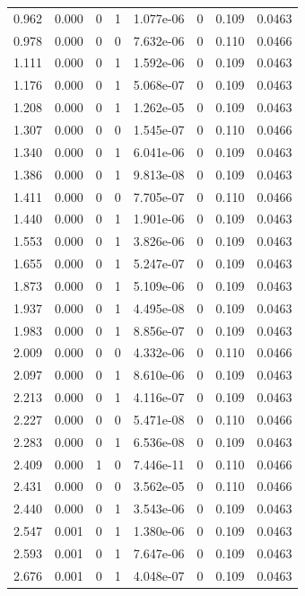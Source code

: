 \documentclass[preview]{standalone}
\begin{document}
{{\begin{tabular}{L{1.2cm}C{1.2cm} C{0.3cm}C{0.5cm} C{1.4cm}C{1.4cm} C{1.4cm}C{1.4cm}}
  0.962  &  0.000  & 0     &  1 &  1.077e-06  & 0  & 0.109 &  0.0463   \\ 
  0.978  &  0.000  & 0     &  0 &  7.632e-06  & 0  & 0.110 &  0.0466   \\ 
  1.111  &  0.000  & 0     &  1 &  1.592e-06  & 0  & 0.109 &  0.0463   \\ 
  1.176  &  0.000  & 0     &  1 &  5.068e-07  & 0  & 0.109 &  0.0463   \\ 
  1.208  &  0.000  & 0     &  1 &  1.262e-05  & 0  & 0.109 &  0.0463   \\ 
  1.307  &  0.000  & 0     &  0 &  1.545e-07  & 0  & 0.110 &  0.0466   \\ 
  1.340  &  0.000  & 0     &  1 &  6.041e-06  & 0  & 0.109 &  0.0463   \\ 
  1.386  &  0.000  & 0     &  1 &  9.813e-08  & 0  & 0.109 &  0.0463   \\ 
  1.411  &  0.000  & 0     &  0 &  7.705e-07  & 0  & 0.110 &  0.0466   \\ 
  1.440  &  0.000  & 0     &  1 &  1.901e-06  & 0  & 0.109 &  0.0463   \\ 
  1.553  &  0.000  & 0     &  1 &  3.826e-06  & 0  & 0.109 &  0.0463   \\ 
  1.655  &  0.000  & 0     &  1 &  5.247e-07  & 0  & 0.109 &  0.0463   \\ 
  1.873  &  0.000  & 0     &  1 &  5.109e-06  & 0  & 0.109 &  0.0463   \\ 
  1.937  &  0.000  & 0     &  1 &  4.495e-08  & 0  & 0.109 &  0.0463   \\ 
  1.983  &  0.000  & 0     &  1 &  8.856e-07  & 0  & 0.109 &  0.0463   \\ 
  2.009  &  0.000  & 0     &  0 &  4.332e-06  & 0  & 0.110 &  0.0466   \\ 
  2.097  &  0.000  & 0     &  1 &  8.610e-06  & 0  & 0.109 &  0.0463   \\ 
  2.213  &  0.000  & 0     &  1 &  4.116e-07  & 0  & 0.109 &  0.0463   \\ 
  2.227  &  0.000  & 0     &  0 &  5.471e-08  & 0  & 0.110 &  0.0466   \\ 
  2.283  &  0.000  & 0     &  1 &  6.536e-08  & 0  & 0.109 &  0.0463   \\ 
  2.409  &  0.000  & 1     &  0 &  7.446e-11  & 0  & 0.110 &  0.0466   \\ 
  2.431  &  0.000  & 0     &  0 &  3.562e-05  & 0  & 0.110 &  0.0466   \\ 
  2.440  &  0.000  & 0     &  1 &  3.543e-06  & 0  & 0.109 &  0.0463   \\ 
  2.547  &  0.001  & 0     &  1 &  1.380e-06  & 0  & 0.109 &  0.0463   \\ 
  2.593  &  0.001  & 0     &  1 &  7.647e-06  & 0  & 0.109 &  0.0463   \\ 
  2.676  &  0.001  & 0     &  1 &  4.048e-07  & 0  & 0.109 &  0.0463   \\ 
\hline 
\end{tabular} 

}}
\end{document}
